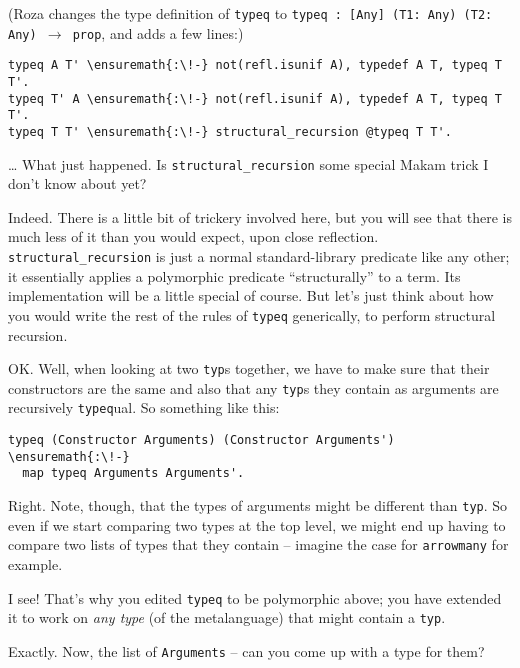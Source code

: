 \begin{scenecomment}
(Roza changes the type definition of \texttt{typeq} to \texttt{typeq : [Any] (T1: Any) (T2: Any) \ensuremath{\to} prop},
and adds a few lines:)
\end{scenecomment}

\begin{verbatim}
typeq A T' \ensuremath{:\!-} not(refl.isunif A), typedef A T, typeq T T'.
typeq T' A \ensuremath{:\!-} not(refl.isunif A), typedef A T, typeq T T'.
typeq T T' \ensuremath{:\!-} structural_recursion @typeq T T'.
\end{verbatim}

\heroSTUDENT{} \ldots{} What just happened. Is \texttt{structural\_recursion}
some special Makam trick I don't know about yet?

\heroADVISOR{} Indeed. There is a little bit of trickery involved here, but
you will see that there is much less of it than you would expect, upon
close reflection. \texttt{structural\_recursion} is just a normal
standard-library predicate like any other; it essentially applies a
polymorphic predicate ``structurally'' to a term. Its implementation
will be a little special of course. But let's just think about how you
would write the rest of the rules of \texttt{typeq} generically, to
perform structural recursion.

\heroSTUDENT{} OK. Well, when looking at two \texttt{typ}s together, we have
to make sure that their constructors are the same and also that any
\texttt{typ}s they contain as arguments are recursively
\texttt{typeq}ual. So something like this:

\begin{verbatim}
typeq (Constructor Arguments) (Constructor Arguments') \ensuremath{:\!-}
  map typeq Arguments Arguments'.
\end{verbatim}

\heroADVISOR{} Right. Note, though, that the types of arguments might be
different than \texttt{typ}. So even if we start comparing two types at
the top level, we might end up having to compare two lists of types that
they contain -- imagine the case for \texttt{arrowmany} for example.

\heroSTUDENT{} I see! That's why you edited \texttt{typeq} to be polymorphic
above; you have extended it to work on \emph{any type} (of the
metalanguage) that might contain a \texttt{typ}.

\heroADVISOR{} Exactly. Now, the list of \texttt{Arguments} -- can you come up
with a type for them?

